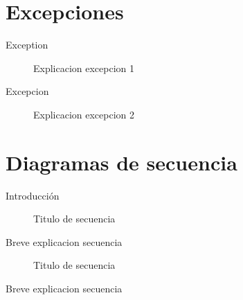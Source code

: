 \documentclass[titlepage,a4paper]{article}
\begin{document}
\section{Excepciones}\label{sec:excepciones}

\begin{description}
\item[Exception] Explicacion excepcion 1
\item[Excepcion] Explicacion excepcion 2
\end{description}

\section{Diagramas de secuencia}\label{sec:diagramasdesecuencia}

Introducción

\begin{figure}[H]
\centering
\caption{\label{fig:seq01}Titulo de secuencia}
\end{figure}

Breve explicacion secuencia 

\begin{figure}[H]
\centering
\caption{\label{fig:seq02}Titulo de secuencia}
\end{figure}

Breve explicacion secuencia
\end{document}
